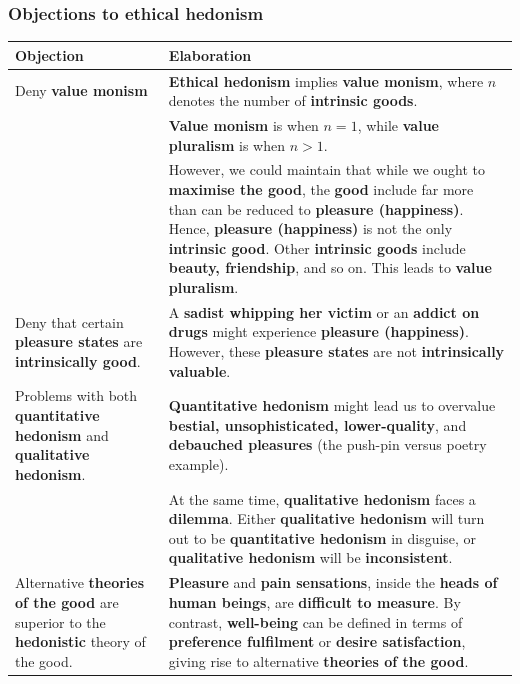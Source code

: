 \documentclass[11pt]{article}
\begin{document}
 \newpage
\subsubsection{Objections to ethical hedonism}
\label{sec:orgd78ce60}
\begin{center}
\begin{tabular}{|m{10em}|m{25em}|}
\hline
Objection & Elaboration\\
\hline
Deny \textbf{value monism} & \textbf{Ethical hedonism} implies \textbf{value monism}, where \(n\) denotes the number of \textbf{intrinsic goods}.\\
 & \textbf{Value monism} is when \(n = 1\), while \textbf{value pluralism} is when \(n > 1\).\\
 & However, we could maintain that while we ought to \textbf{maximise the good}, the \textbf{good} include far more than can be reduced to \textbf{pleasure (happiness)}. Hence, \textbf{pleasure (happiness)} is not the only \textbf{intrinsic good}. Other \textbf{intrinsic goods} include \textbf{beauty, friendship}, and so on. This leads to \textbf{value pluralism}.\\
\hline
Deny that certain \textbf{pleasure states} are \textbf{intrinsically good}. & A \textbf{sadist whipping her victim} or an \textbf{addict on drugs} might experience \textbf{pleasure (happiness)}. However, these \textbf{pleasure states} are not \textbf{intrinsically valuable}.\\
Problems with both \textbf{quantitative hedonism} and \textbf{qualitative hedonism}. & \textbf{Quantitative hedonism} might lead us to overvalue \textbf{bestial, unsophisticated, lower-quality}, and \textbf{debauched pleasures} (the push-pin versus poetry example).\\
 & At the same time, \textbf{qualitative hedonism} faces a \textbf{dilemma}. Either \textbf{qualitative hedonism} will turn out to be \textbf{quantitative hedonism} in disguise, or \textbf{qualitative hedonism} will be \textbf{inconsistent}.\\
\hline
Alternative \textbf{theories of the good} are superior to the \textbf{hedonistic} theory of the good. & \textbf{Pleasure} and \textbf{pain sensations}, inside the \textbf{heads of human beings}, are \textbf{difficult to measure}. By contrast, \textbf{well-being} can be defined in terms of \textbf{preference fulfilment} or \textbf{desire satisfaction}, giving rise to alternative \textbf{theories of the good}.\\
\hline
\end{tabular}
\end{center}
\end{document}
